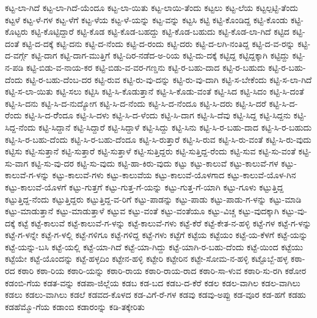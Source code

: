 ಕಟ್ಟ-ಲಾ-ಗಿದೆ
ಕಟ್ಟ-ಲಾ-ಗಿದೆ-ಯೆಂದೂ
ಕಟ್ಟ-ಲಾ-ಯಿತು
ಕಟ್ಟ-ಲಾಯಿ-ತೆಂದು
ಕಟ್ಟಲು
ಕಟ್ಟ-ಲೆಯ
ಕಟ್ಟಲ್ಪಟ್ಟಿ-ತೆಂದು
ಕಟ್ಟಳೆ
ಕಟ್ಟ-ಳೆ-ಗಳ
ಕಟ್ಟ-ಳೆಗೆ
ಕಟ್ಟ-ಳೆಯ
ಕಟ್ಟ-ಳೆ-ಯನ್ನು
ಕಟ್ಟ-ವನ್ನು
ಕಟ್ಟಸಿ
ಕಟ್ಟಿ
ಕಟ್ಟಿ-ಕೊಂಡಿದ್ದ
ಕಟ್ಟಿ-ಕೊಂಡು
ಕಟ್ಟಿ-ಕೊಟ್ಟರು
ಕಟ್ಟಿ-ಕೊಟ್ಟಿದ್ದಾರೆ
ಕಟ್ಟಿ-ಕೊಡ
ಕಟ್ಟಿ-ಕೊಡ-ಬಹದ್ದು
ಕಟ್ಟಿ-ಕೊಡ-ಬಹುದು
ಕಟ್ಟಿ-ಕೊಡ-ಲಾ-ಗಿದೆ
ಕಟ್ಟಿದ
ಕಟ್ಟಿ-ದಂತೆ
ಕಟ್ಟಿ-ದ-ದಕ್ಕೆ
ಕಟ್ಟಿ-ದನು
ಕಟ್ಟಿ-ದ-ನೆಂದು
ಕಟ್ಟಿ-ದ-ರಂದು
ಕಟ್ಟಿ-ದರು
ಕಟ್ಟಿ-ದ-ಲಗಿ-ನಂತಿದ್ದ
ಕಟ್ಟಿ-ದ-ವ-ರನ್ನು
ಕಟ್ಟಿ-ದ-ವರ್ಗ್ಗೆ
ಕಟ್ಟಿ-ದಾಗ
ಕಟ್ಟಿ-ದಾಗ-ಮುತ್ತಿಗೆ
ಕಟ್ಟಿ-ದಿರ-ನಡೆದ-ಅ-ರಿಯ
ಕಟ್ಟಿ-ದು-ದಕ್ಕೆ
ಕಟ್ಟಿದ್ದ
ಕಟ್ಟಿದ್ದಕ್ಕಾಗಿ
ಕಟ್ಟಿದ್ದು
ಕಟ್ಟಿ-ನ-ಪಡಿ
ಕಟ್ಟಿ-ಬಿಡು-ವ-ನಾಯ-ಕರ
ಕಟ್ಟಿ-ಬಿಡು-ವ-ವರ-ಗಣ್ಡನು
ಕಟ್ಟಿ-ರ-ಬಹು-ದಾದ
ಕಟ್ಟಿ-ರ-ಬಹುದು
ಕಟ್ಟಿ-ರ-ಬಹು-ದೆಂದು
ಕಟ್ಟಿ-ರ-ಬಹು-ದೆಂಬ-ದರ
ಕಟ್ಟಿ-ರುವ
ಕಟ್ಟಿ-ರು-ವು-ದನ್ನು
ಕಟ್ಟಿ-ರು-ವು-ದಾಗಿ
ಕಟ್ಟಿ-ಸ-ಬೇಕೆಂದು
ಕಟ್ಟಿ-ಸ-ಲಾ-ಗಿದೆ
ಕಟ್ಟಿ-ಸ-ಲಾ-ಯಿತು
ಕಟ್ಟಿ-ಸಲು
ಕಟ್ಟಿಸಿ
ಕಟ್ಟಿ-ಸಿ-ಕೊಡುತ್ತಾನೆ
ಕಟ್ಟಿ-ಸಿ-ಕೊಡು-ವಂತೆ
ಕಟ್ಟಿ-ಸಿದ
ಕಟ್ಟಿ-ಸಿದಂ
ಕಟ್ಟಿ-ಸಿ-ದಂತೆ
ಕಟ್ಟಿ-ಸಿ-ದನು
ಕಟ್ಟಿ-ಸಿ-ದ-ನುದ್ಯೋಗ
ಕಟ್ಟಿ-ಸಿ-ದ-ನೆಂದು
ಕಟ್ಟಿ-ಸಿ-ದ-ನೆಂದೂ
ಕಟ್ಟಿ-ಸಿ-ದರು
ಕಟ್ಟಿ-ಸಿ-ದರೆ
ಕಟ್ಟಿ-ಸಿ-ದ-ರೆಂದು
ಕಟ್ಟಿ-ಸಿ-ದ-ರೆೆಂದೂ
ಕಟ್ಟಿ-ಸಿ-ದಳು
ಕಟ್ಟಿ-ಸಿ-ದ-ಳೆಂದು
ಕಟ್ಟಿ-ಸಿ-ದಾಗ
ಕಟ್ಟಿ-ಸಿ-ದೆವು
ಕಟ್ಟಿ-ಸಿದ್ದ
ಕಟ್ಟಿ-ಸಿದ್ದನು
ಕಟ್ಟಿ-ಸಿದ್ದ-ನೆಂದು
ಕಟ್ಟಿ-ಸಿದ್ದಾನೆ
ಕಟ್ಟಿ-ಸಿದ್ದಾರೆ
ಕಟ್ಟಿ-ಸಿದ್ದಾಳೆ
ಕಟ್ಟಿ-ಸಿದ್ದು
ಕಟ್ಟಿ-ಸಿನು
ಕಟ್ಟಿ-ಸಿ-ರ-ಬಹು-ದಾದ
ಕಟ್ಟಿ-ಸಿ-ರ-ಬಹುದು
ಕಟ್ಟಿ-ಸಿ-ರ-ಬಹು-ದೆಂದು
ಕಟ್ಟಿ-ಸಿ-ರ-ಬಹು-ದೆಂದೂ
ಕಟ್ಟಿ-ಸಿ-ರುತ್ತಾರೆ
ಕಟ್ಟಿ-ಸಿ-ರುವ
ಕಟ್ಟಿ-ಸಿ-ರು-ವಂತೆ
ಕಟ್ಟಿ-ಸಿ-ರು-ವುದು
ಕಟ್ಟಿಸು
ಕಟ್ಟಿ-ಸುತ್ತಾನೆ
ಕಟ್ಟಿ-ಸುತ್ತಾರೆ
ಕಟ್ಟಿ-ಸುತ್ತಾಳೆ
ಕಟ್ಟಿ-ಸುತ್ತಿದ್ದರು
ಕಟ್ಟಿ-ಸುತ್ತಿದ್ದ-ರೆಂದು
ಕಟ್ಟಿ-ಸುವ
ಕಟ್ಟಿ-ಸು-ವಂತೆ
ಕಟ್ಟಿ-ಸು-ವಾಗ
ಕಟ್ಟಿ-ಸು-ವು-ದರ
ಕಟ್ಟಿ-ಸು-ವುದು
ಕಟ್ಟಿ-ಹಾ-ಕಿರು-ವುದು
ಕಟ್ಟು
ಕಟ್ಟು-ಕಾಲುವೆ
ಕಟ್ಟು-ಕಾಲುವೆ-ಗಳ
ಕಟ್ಟು-ಕಾಲುವೆ-ಗ-ಳನ್ನು
ಕಟ್ಟು-ಕಾಲುವೆ-ಗಳು
ಕಟ್ಟು-ಕಾಲುವೆಯ
ಕಟ್ಟು-ಕಾಲುವೆ-ಯೊಳಗಾದ
ಕಟ್ಟು-ಕಾಲುವೆ-ಯೊಳ-ಗಿನ
ಕಟ್ಟು-ಕಾಲುವೆ-ಯೊಳಗೆ
ಕಟ್ಟು-ಗುತ್ತಗೆ
ಕಟ್ಟು-ಗುತ್ತ-ಗೆ-ಯನ್ನು
ಕಟ್ಟು-ಗುತ್ತ-ಗೆ-ಯಾಗಿ
ಕಟ್ಟು-ಗೂಳು
ಕಟ್ಟುತ್ತಿದ್ದ
ಕಟ್ಟುತ್ತಿದ್ದ-ನೆಂದು
ಕಟ್ಟುತ್ತಿದ್ದರು
ಕಟ್ಟುತ್ತಿದ್ದ-ವ-ರಿಗೆ
ಕಟ್ಟು-ಪಾಡನ್ನು
ಕಟ್ಟು-ಪಾಡು
ಕಟ್ಟು-ಪಾಡು-ಗ-ಳನ್ನು
ಕಟ್ಟು-ಮಾಡಿ
ಕಟ್ಟು-ಮಾಡುತ್ತಾನೆ
ಕಟ್ಟು-ಮಾಡುತ್ತಾಳೆ
ಕಟ್ಟುವ
ಕಟ್ಟು-ವಂತೆ
ಕಟ್ಟು-ವಂತೆಯೂ
ಕಟ್ಟು-ವಿಚ್ಚ
ಕಟ್ಟು-ವುದಕ್ಕಾಗಿ
ಕಟ್ಟು-ವು-ದಕ್ಕೆ
ಕಟ್ಟೆ
ಕಟ್ಟೆ-ಕಾಲುವೆ
ಕಟ್ಟೆ-ಕಾಲುವೆ-ಗ-ಳನ್ನು
ಕಟ್ಟೆ-ಕಾಲುವೆ-ಗಳು
ಕಟ್ಟೆ-ಕೆರೆ
ಕಟ್ಟೆ-ಕೇತ-ನ-ಹಳ್ಳಿ
ಕಟ್ಟೆ-ಗಳ
ಕಟ್ಟೆ-ಗ-ಳನ್ನು
ಕಟ್ಟೆ-ಗ-ಳನ್ನೇ
ಕಟ್ಟೆ-ಗ-ಳಲ್ಲಿ
ಕಟ್ಟೆ-ಗಳಿಗೂ
ಕಟ್ಟೆ-ಗಳಿದ್ದ
ಕಟ್ಟೆ-ಗಳು
ಕಟ್ಟೆಗೆ
ಕಟ್ಟೆಯ
ಕಟ್ಟೆಯಂ
ಕಟ್ಟೆ-ಯ-ಕೆಳಗೆ
ಕಟ್ಟೆ-ಯನ್ನು
ಕಟ್ಟೆ-ಯನ್ನು-ಬಸಿ
ಕಟ್ಟೆ-ಯಲ್ಲಿ
ಕಟ್ಟೆ-ಯಾ-ಗಿದೆ
ಕಟ್ಟೆ-ಯಾ-ಗಿದ್ದು
ಕಟ್ಟೆ-ಯಾಗಿ-ರ-ಬಹು-ದೆಂದು
ಕಟ್ಟೆ-ಯಿಂದ
ಕಟ್ಟೆಯು
ಕಟ್ಟೆಯೇ
ಕಟ್ಟೆ-ಯೊಂದನ್ನು
ಕಟ್ಟೆ-ಹಳ್ಳದಿಂ
ಕಟ್ಟೇನ-ಹಳ್ಳಿ
ಕಟ್ಟೇರಿ
ಕಟ್ಟೇರಿನ
ಕಟ್ಟೇ-ಸೋಮ-ನ-ಹಳ್ಳಿ
ಕಟ್ಟೊಬ್ಬೆ-ಹಳ್ಳ
ಕಠಾ-ರದ
ಕಠಾರಿ
ಕಠಾ-ರಿಯ
ಕಠಾರಿ-ಯನ್ನು
ಕಠಾರಿ-ರಾಯ
ಕಠಾರಿ-ರಾಯ-ರಾದ
ಕಠಾರಿ-ಸಾ-ಳುವ
ಕಠಾರಿ-ಸು-ರಗಿ
ಕಠೋರ
ಕಡಂಬಿ-ಗೆಯ
ಕಡತ-ವನ್ನು
ಕಡಪಾ-ಜಿಲ್ಲೆಯ
ಕಡಬ
ಕಡ-ಬದ
ಕಡಬ-ದ-ಕೆರೆ
ಕಡಲ
ಕಡಲ-ವಾಗಿಲ
ಕಡಲ-ವಾಗಿಲು
ಕಡಲು
ಕಡಲು-ವಾಗಿಲು
ಕಡಲೆ
ಕಡವದ-ಕೊಳದ
ಕಡ-ವಿಗೆ-ರೆ-ಗಳ
ಕಡವು
ಕಡವು-ಅಪ್ಪು
ಕಡ-ವೂರ
ಕಡ-ಹಗೆ
ಕಡಹು
ಕಡಹೆಮ್ಮೊ-ಗೆಯ
ಕಡಾಂಬಿ
ಕಡಾರಂನ್ನು
ಕಡಿ-ತಕ್ಕೇರಿತು
